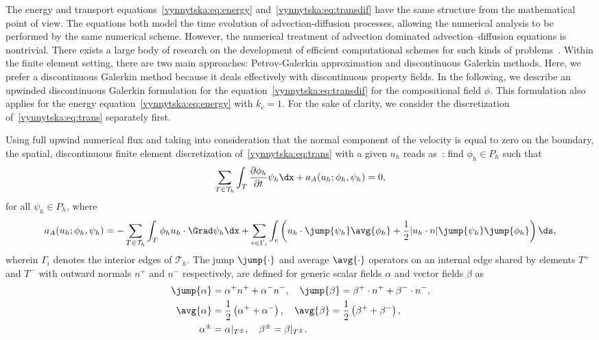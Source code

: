 The energy and transport equations~\eqref{vynnytska:eq:energy}
and~\eqref{vynnytska:eq:transdif} have the same structure from the
mathematical point of view. The equations both model the time
evolution of advection-diffusion processes, allowing the numerical
analysis to be performed by the same numerical scheme. However, the
numerical treatment of advection dominated advection--diffusion
equations is nontrivial. There exists a large body of research on the
development of efficient computational schemes for such kinds of
problems~\citep{Lin2006, ZienkiewiczTaylor2000}.  Within the finite
element setting, there are two main approaches: Petrov-Galerkin
approximation and discontinuous Galerkin methods. Here, we prefer a
discontinuous Galerkin method because it deals effectively with
discontinuous property fields. In the following, we describe an
upwinded discontinuous Galerkin formulation for the
equation~\eqref{vynnytska:eq:transdif} for the compositional field
$\phi$. This formulation also applies for the energy
equation~\eqref{vynnytska:eq:energy} with $k_c = 1$. For the sake of
clarity, we consider the discretization of~\eqref{vynnytska:eq:trans}
separately first.

Using full upwind numerical flux and taking into consideration that
the normal component of the velocity is equal to zero on the boundary, the
spatial, discontinuous finite element discretization
of~\eqref{vynnytska:eq:trans} with a given $u_h$ reads
as~\citep{PietroLoForteParolini2006}: find $\phi_h \in P_h$ such that
\begin{equation}
  \sum_{T \in \mathcal{T}_h} \int_T \frac{\partial \phi_h}{\partial t} \psi_h
  \dx + a_{A} (u_h; \phi_h, \psi_h) = 0,
\end{equation}
for all $\psi_h \in P_h$, where
\begin{equation}
  \label{vynnytska:eq:dgadv}
   a_{A} (u_h; \phi_h, \psi_h )
   =
   - \sum_{T \in \mathcal{T}_h} \int_T \phi_h u_h \cdot \Grad \psi_h \dx
   + \sum_{e \in \Gamma_i} \int_{e} \left (
   u_h \cdot \jump{\psi_h} \avg{\phi_h} + \frac{1}{2}
   | u_h \cdot n | \jump{\psi_h} \jump{\phi_h} \right ) \ds,
\end{equation}
wherein $\Gamma_i$ denotes the interior edges of $\mathcal{T}_h$. The
jump $\jump{\cdot}$ and average $\avg{\cdot}$ operators on an internal
edge shared by elements $T^{+}$ and $T^{-}$ with outward normals $n^+$
and $n^-$ respectively, are defined for generic scalar fields $\alpha$
and vector fields $\beta$ as
\begin{align}
  \jump{\alpha}&= \alpha^{+} n^{+} + \alpha^{-} n^{-}, \quad
  \jump{\beta}  = \beta^{+} \cdot n^{+} + \beta^{-} \cdot n^{-}, \\
  \avg{\alpha} &= \frac{1}{2} \left( \alpha^{+} + \alpha^{-} \right), \quad
  \avg{\beta}   = \frac{1}{2} \left( \beta^{+} + \beta^{-} \right), \\
  \alpha^{\pm}  &= \alpha |_{T^{\pm}}, \quad
  \beta^{\pm}    = \beta |_{T^{\pm}}.
\end{align}

